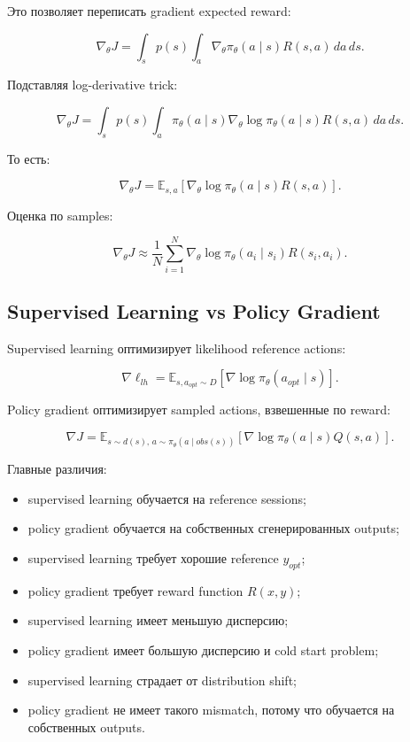 \documentclass[a4paper,12pt]{article}
\begin{document}
Это позволяет переписать gradient expected reward:

\[
\nabla_\theta J
=
\int_s p(s)
\int_a
\nabla_\theta \pi_\theta(a\mid s)
R(s,a)
\,da\,ds.
\]

Подставляя log-derivative trick:

\[
\nabla_\theta J
=
\int_s p(s)
\int_a
\pi_\theta(a\mid s)
\nabla_\theta
\log \pi_\theta(a\mid s)
R(s,a)
\,da\,ds.
\]

То есть:

\[
\nabla_\theta J
=
\mathbb{E}_{s,a}
[
\nabla_\theta
\log \pi_\theta(a\mid s)
R(s,a)
].
\]

Оценка по samples:

\[
\nabla_\theta J
\approx
\frac{1}{N}
\sum_{i=1}^{N}
\nabla_\theta
\log \pi_\theta(a_i\mid s_i)
R(s_i,a_i).
\]

\subsection{Supervised Learning vs Policy Gradient}

Supervised learning оптимизирует likelihood reference actions:

\[
\nabla \ell_{lh}
=
\mathbb{E}_{s,a_{opt}\sim D}
[
\nabla \log \pi_\theta(a_{opt}\mid s)
].
\]

Policy gradient оптимизирует sampled actions, взвешенные по reward:

\[
\nabla J
=
\mathbb{E}_{s\sim d(s),\,a\sim\pi_\theta(a\mid obs(s))}
[
\nabla \log \pi_\theta(a\mid s)
Q(s,a)
].
\]

Главные различия:

\begin{itemize}
    \item supervised learning обучается на reference sessions;
    \item policy gradient обучается на собственных сгенерированных outputs;
    \item supervised learning требует хорошие reference \(y_{opt}\);
    \item policy gradient требует reward function \(R(x,y)\);
    \item supervised learning имеет меньшую дисперсию;
    \item policy gradient имеет большую дисперсию и cold start problem;
    \item supervised learning страдает от distribution shift;
    \item policy gradient не имеет такого mismatch, потому что обучается на собственных outputs.
\end{itemize}
\end{document}
